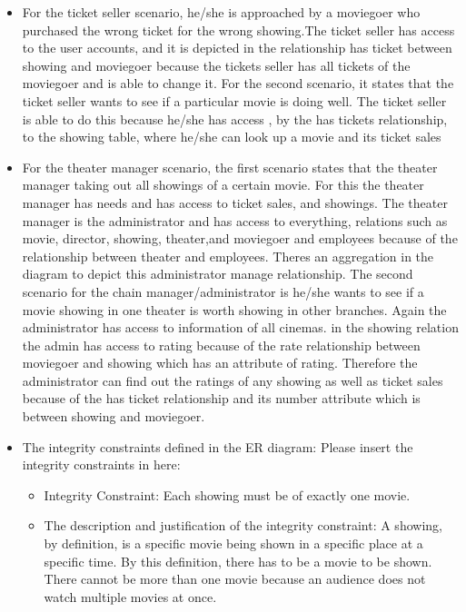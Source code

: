 {\begin{itemize}
For the second scenario , it states that the showing manager has the ability to remove a showtime of a movie, the manage relationship between showing and theater manager, the attributes for the showing relation has time and date and it can be changed by the theater manager.
\item{ }
For the ticket seller scenario, he/she is approached by a moviegoer who purchased the wrong ticket for the wrong showing.The ticket seller has access to the user accounts, and it is depicted in the relationship has ticket between showing and moviegoer because the tickets seller has all tickets of the moviegoer and is able to change it.
For the second scenario, it states that the ticket seller wants to see if  a particular movie is doing well. The ticket seller is able to do this because he/she has access , by the has tickets relationship, to the showing table, where he/she can look up a movie and its ticket sales
\item{ }
For the theater manager scenario, the first scenario states that the theater manager taking out all showings of a certain movie. For this the theater manager has needs and has access to ticket sales, and showings. The theater manager is the administrator and has access to everything, relations such as movie, director, showing, theater,and moviegoer and employees because of the relationship between theater and employees. Theres an aggregation in the diagram to depict this administrator manage relationship.
The second scenario for the chain manager/administrator is he/she wants to see if a movie showing in one theater is worth showing in other branches. Again the administrator has access to information of all cinemas. in the showing relation the admin has access to rating because of the rate relationship between moviegoer and showing which has an attribute of rating. Therefore the administrator can find out the ratings of any showing as well as ticket sales because of the has ticket relationship and its number attribute which is between showing and moviegoer.
\item{ The integrity constraints defined in the ER diagram: }
Please insert the integrity constraints in here:
\begin{itemize} 
\item{ Integrity Constraint: }
Each showing must be of exactly one movie.
\item{ The description and justification of the integrity constraint: }
 A showing, by definition, is a specific movie being shown in a specific place at a specific time.  By this definition, there has to be a movie to be shown.  There cannot be more than one movie because an audience does not watch multiple movies at once.

\end{itemize}
\end{itemize}}
